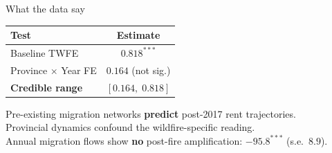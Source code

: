 \documentclass[aspectratio=169, 10pt]{beamer}
\begin{document}
\begin{frame}{What the data say}

\bigskip
\begin{center}
\begin{tabular}{lc}
\toprule
Test & Estimate \\
\midrule
Baseline TWFE & $0.818^{***}$ \\
Province $\times$ Year FE & $0.164$ \quad (not sig.) \\
\midrule
\textbf{Credible range} & $[0.164,\; 0.818]$ \\
\bottomrule
\end{tabular}
\end{center}

\bigskip
\begin{center}
{\small Pre-existing migration networks \textbf{predict} post-2017 rent trajectories.}\\[4pt]
{\small Provincial dynamics confound the wildfire-specific reading.}\\[4pt]
{\small Annual migration flows show \textbf{no} post-fire amplification: $-95.8^{***}$ (s.e.\ $8.9$).}
\end{center}

\end{frame}
\end{document}
